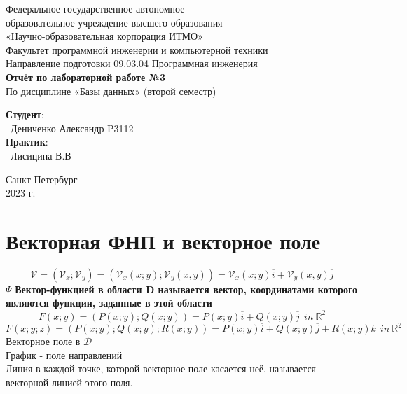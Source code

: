 \documentclass{article}
\begin{document}
\begin{center}
    \Large
    Федеральное государственное автономное \\
    образовательное учреждение высшего образования \\ 
    «Научно-образовательная корпорация ИТМО»\\
    \vspace{0.5cm}
    \large
    Факультет программной инженерии и компьютерной техники \\
    Направление подготовки 09.03.04 Программная инженерия \\
    \vspace{1cm}
    \Large
    \textbf{Отчёт по лабораторной работе №3} \\
    По дисциплине «Базы данных» (второй семестр)\\
    \large
    \vspace{8cm}

    \begin{minipage}{.33\textwidth}
    \end{minipage}
    \hfill
    \begin{minipage}{.4\textwidth}
    
        \textbf{Студент}: \vspace{.1cm} \\
        \ Дениченко Александр P3112\\
        \textbf{Практик}:  \\
        \ Лисицина В.В
    \end{minipage}
    \vfill
Санкт-Петербург\\ 2023 г.
\end{center}

\newpage

\section{Векторная ФНП и векторное поле}
\begin{equation*}
    \overline{\mathcal{V}} = (\mathcal{V}_x; \mathcal{V}_y) = (\mathcal{V}_x(x;y);\mathcal{V}_y(x,y)) = \mathcal{V}_x(x;y)\overline{i}+\mathcal{V}_y(x,y)\overline{j}
\end{equation*}
$\Psi$ \textbf{Вектор-функцией в области D называется вектор, координатами которого являются функции, заданные в этой области}
\begin{equation*}
    \overline{F}(x;y) = (P(x;y); Q(x;y)) = P(x;y)\overline{i}+Q(x;y)\overline{j}\ \ in \ \mathbb{R}^2
\end{equation*}
\begin{equation*}
    \overline{F}(x;y;z) = (P(x;y); Q(x;y); R(x;y)) = P(x;y)\overline{i}+Q(x;y)\overline{j}+R(x;y)\overline{k}\ \ in \ \mathbb{R}^2
\end{equation*}
Векторное поле в $\mathcal{D}$
\\
График - поле направлений
\\
Линия в каждой точке, которой векторное поле касается неё, называется векторной линией этого поля.
\end{document}
